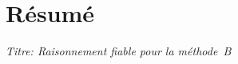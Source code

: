 \chapter*{Résumé}

\begingroup
\ifThesisAfive
  \vspace*{-36pt}
\fi

\begin{otherlanguage}{french}


\noindent\emph{Titre: Raisonnement fiable pour la méthode~B}


\end{otherlanguage}
